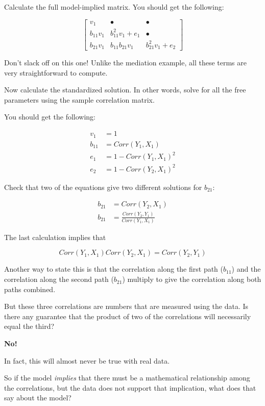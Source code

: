 \documentclass[
]{book}
\begin{document}
Calculate the full model-implied matrix. You should get the following:

\[
\begin{bmatrix}
v_{1}   &   \bullet &  \bullet  \\
b_{11}v_{1}  &   b_{11}^{2}v_{1} + e_{1}    &  \bullet \\
b_{21}v_{1}  &   b_{11}b_{21}v_{1}          &  b_{21}^{2}v_{1} + e_{2}
\end{bmatrix}
\]

Don't slack off on this one! Unlike the mediation example, all these terms are very straightforward to compute.

Now calculate the standardized solution. In other words, solve for all the free parameters using the sample correlation matrix.

You should get the following:

\begin{align}
v_{1}   &= 1                          \\
b_{11}  &= Corr(Y_{1}, X_{1})         \\
e_{1}   &= 1 - Corr(Y_{1}, X_{1})^{2} \\
e_{2}   &= 1 - Corr(Y_{2}, X_{1})^{2}
\end{align}

Check that two of the equations give two different solutions for \(b_{21}\):

\begin{align}
b_{21}  &= Corr(Y_{2}, X_{1})                             \\
b_{21}  &= \frac{Corr(Y_{2}, Y_{1})}{Corr(Y_{1}, X_{1})}
\end{align}

The last calculation implies that

\[
Corr(Y_{1}, X_{1}) Corr(Y_{2}, X_{1}) = Corr(Y_{2}, Y_{1}) 
\]

Another way to state this is that the correlation along the first path (\(b_{11}\)) and the correlation along the second path (\(b_{21}\)) multiply to give the correlation along both paths combined.

But these three correlations are numbers that are measured using the data. Is there any guarantee that the product of two of the correlations will necessarily equal the third?

\textbf{No!}

In fact, this will almost never be true with real data.

So if the model \emph{implies} that there must be a mathematical relationship among the correlations, but the data does not support that implication, what does that say about the model?
\end{document}
